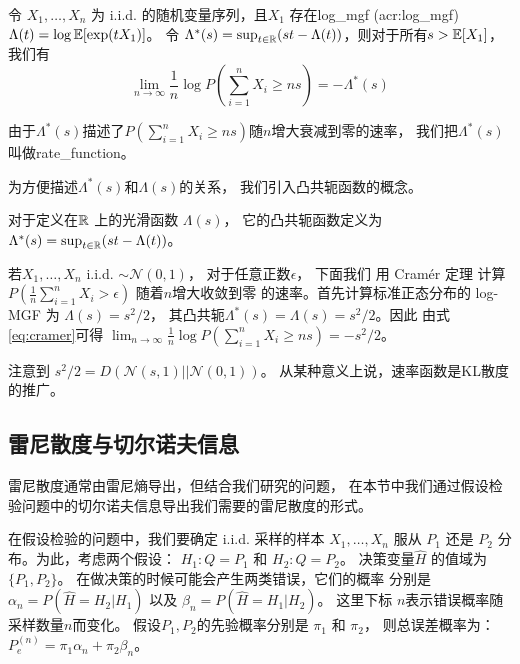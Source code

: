 \begin{theorem}\label{thm:cramer}
  令 $X_1, \dots, X_n$ 为 i.i.d. 的随机变量序列，且$X_1$ 存在\gls{log_mgf} (\gls{acr:log_mgf})
$\Lambda(t)=\log \operatorname{\mathbb{E}}[\exp(t X_1)]$。
令 $\Lambda^*(s)= \sup_{t \in \mathbb{R}} (st-\Lambda(t))$，则对于所有$s>\operatorname{\mathbb{E}}[X_1]$，
我们有
\begin{equation}\label{eq:cramer}
\lim_{n\to \infty} \frac{1}{n}\log P\left(
  \sum_{i=1}^n X_i \geq  ns \right) = - \Lambda^*(s)
\end{equation}
\end{theorem}
由于$\Lambda^*(s)$描述了$P( \sum_{i=1}^n X_i \geq  ns)$随$n$增大衰减到零的速率，
我们把$\Lambda^*(s)$叫做\gls{rate_function}。

为方便描述$\Lambda^*(s)$和$\Lambda(s)$的关系，
我们引入凸共轭函数的概念。
\begin{definition}\label{def:convex_conjugate}
  对于定义在$\mathbb{R}$ 上的光滑函数 $\Lambda(s)$，
  它的凸共轭函数定义为
  $\Lambda^*(s) = \sup_{t \in \mathbb{R}} (st-\Lambda(t))$。
\end{definition}

\begin{example}\label{ex:cramer_ldp}
  若$X_1, \dots, X_n$ i.i.d. $\sim \mathcal{N}(0,1)$，
  对于任意正数$\epsilon$，
  下面我们 用  Cramér 定理 计算 $P(\frac{1}{n} \sum_{i=1}^n X_i > \epsilon)$ 
  随着$n$增大收敛到零
  的速率。首先计算标准正态分布的 log-MGF 为 $\Lambda(s)=s^2/2$，
  其凸共轭$\Lambda^*(s)=\Lambda(s)=s^2/2$。因此
  由式\eqref{eq:cramer}可得
  $\lim_{n\to \infty} \frac{1}{n}\log P( \sum_{i=1}^n X_i \geq  ns) =-s^2/2$。
  \end{example}
\begin{remark}
  注意到 $s^2/2=D(\mathcal{N}(s, 1) || \mathcal{N}(0,1))$。
  从某种意义上说，速率函数是KL散度的推广。
\end{remark}
\subsection{雷尼散度与切尔诺夫信息}
雷尼散度\cite{renyi1961measures}通常由雷尼熵导出，但结合我们研究的问题，
在本节中我们通过假设检验问题中的切尔诺夫信息导出我们需要的雷尼散度的形式。

在假设检验的问题中，我们要确定 i.i.d. 采样的样本
$X_1, \dots, X_n$ 服从
$P_1$ 还是 $P_2$ 分布。为此，考虑两个假设：
$H_1: Q=P_1$ 和 $H_2: Q=P_2$。
决策变量$\widehat{H}$ 的值域为 $\{P_1, P_2\}$。
在做决策的时候可能会产生两类错误，它们的概率
分别是 $\alpha_n=P(\widehat{H}=H_2|H_1)$
以及 $\beta_n=P(\widehat{H}=H_1|H_2)$。
这里下标 $n$表示错误概率随采样数量$n$而变化。
假设$P_1, P_2$的先验概率分别是 $\pi_1$ 和 $\pi_2$，
则总误差概率为：$P_e^{(n)} = \pi_1 \alpha_n
+ \pi_2 \beta_n$。

